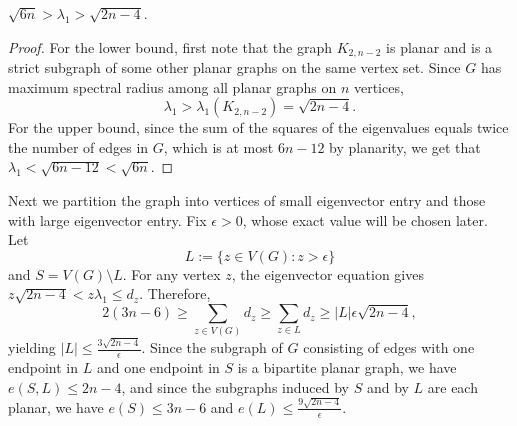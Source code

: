 \begin{lemma}\label{planar trivial spectral bound}
$\sqrt{6n} > \lambda_1> \sqrt{2n-4}$.
\end{lemma}
\begin{proof}
For the lower bound, first note that the graph $K_{2,n-2}$ is planar and is a strict subgraph of some other planar graphs on the same vertex set. Since $G$ has maximum spectral radius among all planar graphs on $n$ vertices,
\[
 \lambda_1 > \lambda_1(K_{2,n-2}) = \sqrt{2n-4}.
 \]
 For the upper bound, since the sum of the squares of the eigenvalues equals twice the number of edges in $G$, which is
 at most $6n-12$ by planarity, we get that $\lambda_1 < \sqrt{6n-12} < \sqrt{6n}$.
\end{proof}


Next we partition the graph into vertices of small eigenvector entry and those with large eigenvector entry.  Fix $\epsilon > 0$,
whose exact value will be chosen later.  Let 
\[
L:= \{z\in V(G): z> \epsilon\}
\]
and $S = V(G) \setminus L$. For any vertex $z$, the eigenvector equation gives $z\sqrt{2n-4} < z\lambda_1\leq d_z$. Therefore,
\[
2(3n - 6)  \geq \sum_{z\in V(G)} d_z \geq \sum_{z\in L} d_z \geq |L|\epsilon \sqrt{2n-4},
\]
yielding $|L| \leq \frac{3\sqrt{2n-4}}{\epsilon}$. Since the subgraph of $G$ consisting of edges with one endpoint in $L$ and one endpoint in $S$ is a bipartite planar graph, we have $e(S,L) \leq 2n-4$, and since the subgraphs induced by $S$ and by $L$ are each planar, we have $e(S) \leq 3n-6$ and $e(L) \leq \frac{9\sqrt{2n-4}}{\epsilon}$. 


